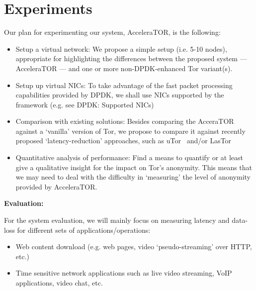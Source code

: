 \documentclass[conference]{IEEEtran}
\begin{document}
\section{Experiments}
Our plan for experimenting our system, AcceleraTOR, is the following:
\begin{itemize}
	
	\item Setup a virtual network: We propose a simple setup (i.e. 5-10 nodes), appropriate for highlighting the differences between the proposed system --- AcceleraTOR --- and one or more non-DPDK-enhanced Tor variant(s).
	
	\item Setup up virtual NICs: To take advantage of the fast packet processing capabilities provided by DPDK, we shall use NICs supported by the framework (e.g. see DPDK: Supported NICs)

	\item Comparison with existing solutions: Besides comparing the AcceraTOR against a `vanilla' version of Tor, we propose to compare it against recently proposed `latency-reduction' approaches, such as uTor~\cite{179191} and/or LasTor~\cite{Akhoondi:2012:LLA:2310656.2310712}

	\item Quantitative analysis of performance: Find a means to quantify or at least give a qualitative insight for the impact on Tor's anonymity. This means that we may need to deal with the difficulty in `measuring' the level of anonymity provided by AcceleraTOR. 

\end{itemize}

\textbf{Evaluation:}

For the system evaluation, we will mainly focus on measuring latency and data-loss for different sets of applications\slash operations:

\begin{itemize}

	\item Web content download (e.g. web pages, video ‘pseudo-streaming’ over HTTP, etc.)
	\item Time sensitive network applications such as live video streaming, VoIP applications, video chat, etc.

\end{itemize}



%

\end{document}
